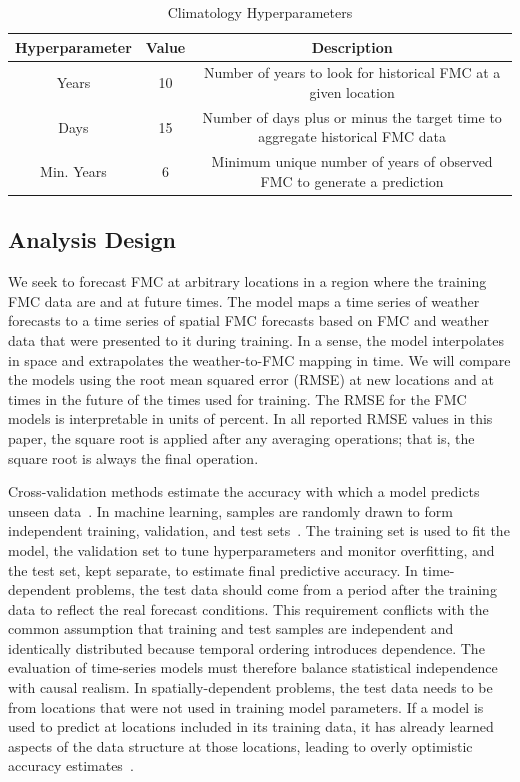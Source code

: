 \documentclass[fire,article,submit,pdftex,moreauthors]{Definitions/mdpi}
\begin{document}
\begin{table}[tbh]
\small
\caption{Climatology Hyperparameters}
\label{tab:clim_params}
\begin{tabularx}{\textwidth}{CCC}
\toprule
\textbf{Hyperparameter} & \textbf{Value} & \textbf{Description} \\
\midrule
Years & 10 & Number of years to look for historical FMC at a given location \\
\midrule
Days & 15 & Number of days plus or minus the target time to aggregate historical FMC data \\
\midrule
Min. Years & 6 & Minimum unique number of years of observed FMC to generate a prediction \\
\bottomrule
\end{tabularx}

\end{table}

\subsection{Analysis Design}
\label{sec:cv}

We seek to forecast FMC at arbitrary locations in a region where the training FMC data are and at future times. The model maps a time series of weather forecasts to a time series of spatial FMC forecasts based on FMC and weather data that were presented to it during training. In a sense, the model interpolates in space and extrapolates the weather-to-FMC mapping in time. We will compare the models using the root mean squared error (RMSE) at new locations and at times in the future of the times used for training. The RMSE for the FMC models is interpretable in units of percent. In all reported RMSE values in this paper, the square root is applied after any averaging operations; that is, the square root is always the final operation.

Cross-validation methods estimate the accuracy with which a model predicts unseen data~\citep[Sect.~7.10]{Hastie-2010-ESL}. In machine learning, samples are randomly drawn to form independent training, validation, and test sets~\citep[Sect.~7.2]{Hastie-2010-ESL}. The training set is used to fit the model, the validation set to tune hyperparameters and monitor overfitting, and the test set, kept separate, to estimate final predictive accuracy. In time-dependent problems, the test data should come from a period after the training data to reflect the real forecast conditions. This requirement conflicts with the common assumption that training and test samples are independent and identically distributed because temporal ordering introduces dependence. The evaluation of time-series models must therefore balance statistical independence with causal realism. In spatially-dependent problems, the test data needs to be from locations that were not used in training model parameters. If a model is used to predict at locations included in its training data, it has already learned aspects of the data structure at those locations, leading to overly optimistic accuracy estimates~\citep{Schreck-2023-MLV}.
\end{document}
